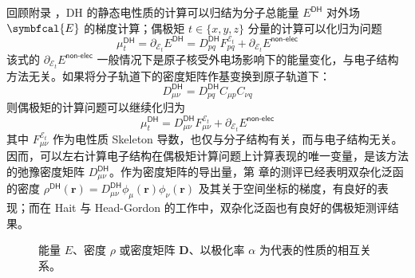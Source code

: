 回顾附录 ，DH 的静态电性质的计算可以归结为分子总能量 $E^\textsf{DH}$ 对外场 $\symbfcal{E}$ 的梯度计算；偶极矩 $t \in \{ x, y, z \}$ 分量的计算可以化归为问题
\begin{equation*}
    \mu_t^\textsf{DH} = \partial_{\mathcal{E}_t} E^\textsf{DH} = D_{pq}^\textsf{DH} F_{pq}^{\mathcal{E}_t} + \partial_{\mathcal{E}_t} E^\textsf{non-elec}
\end{equation*}
该式的 $\partial_{\mathcal{E}_t} E^\textsf{non-elec}$ 一般情况下是原子核受外电场影响下的能量变化，与电子结构方法无关。如果将分子轨道下的密度矩阵作基变换到原子轨道下：
\begin{equation*}
    D_{\mu \nu}^\textsf{DH} = D_{pq}^\textsf{DH} C_{\mu p} C_{\nu q}
\end{equation*}
则偶极矩的计算问题可以继续化归为
\begin{equation}
    \mu_t^\textsf{DH} = D_{\mu \nu}^\textsf{DH} F_{\mu \nu}^{\mathcal{E}_t} + \partial_{\mathcal{E}_t} E^\textsf{non-elec}
\end{equation}
其中 $F_{\mu \nu}^{\mathcal{E}_t}$ 作为电性质 Skeleton 导数，也仅与分子结构有关，而与电子结构无关。因而，可以左右计算电子结构在偶极矩计算问题上计算表现的唯一变量，是该方法的弛豫密度矩阵 $D_{\mu \nu}^\textsf{DH}$。作为密度矩阵的导出量，第  章的测评已经表明双杂化泛函的密度 $\rho^\textsf{DH} (\bm{r}) = D_{\mu \nu}^\textsf{DH} \phi_\mu (\bm{r}) \phi_\nu (\bm{r})$ 及其关于空间坐标的梯度，有良好的表现；而在 Hait 与 Head-Gordon 的工作\cite{Hait-Head-Gordon.JCTC.2018}中，双杂化泛函也有良好的偶极矩测评结果。

\begin{figure}[h]
\centering
{}
\caption[能量、密度与性质的关系]{能量 $E$、密度 $\rho$ 或密度矩阵 $\mathbf{D}$、以极化率 $\alpha$ 为代表的性质的相互关系。}
\label{fig.6.rel-eng-dm-prop}
\end{figure}

